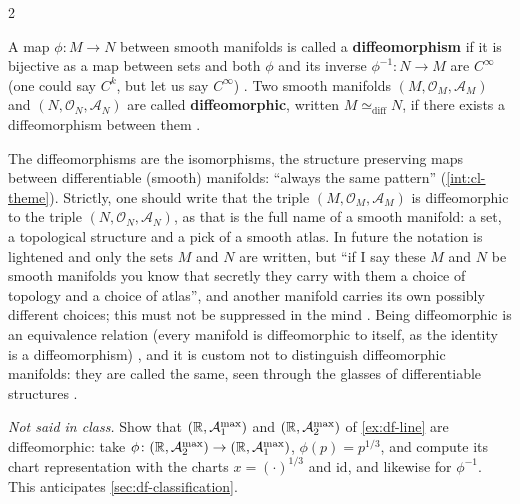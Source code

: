\begin{paracol}{2}
\begin{definition}\label{def:df-diffeo}
A map $\phi\colon M\to N$ between smooth manifolds is called a \textbf{diffeomorphism} if it is bijective as a map between sets and both $\phi$ and its inverse $\phi^{-1}\colon N\to M$ are $C^\infty$ (one could say $C^k$, but let us say $C^\infty$)
. Two smooth manifolds $(M,\mathcal O_M,\mathcal A_M)$ and $(N,\mathcal O_N,\mathcal A_N)$ are called \textbf{diffeomorphic}, written $M\simeq_{\mathrm{diff}}N$, if there exists a diffeomorphism between them
.
\end{definition}
The diffeomorphisms are the isomorphisms, the structure preserving maps between differentiable (smooth) manifolds: ``always the same pattern'' (\cref{int:cl-theme}). Strictly, one should write that the triple $(M,\mathcal O_M,\mathcal A_M)$ is diffeomorphic to the triple $(N,\mathcal O_N,\mathcal A_N)$, as that is the full name of a smooth manifold:
a set, a topological structure and a pick of a smooth atlas. In future the notation is lightened and only the sets $M$ and $N$ are written, but ``if I say these $M$ and $N$ be smooth manifolds you know that secretly they carry with them a choice of topology and a choice of atlas'', and another manifold carries its own possibly
different choices; this must not be suppressed in the mind . Being diffeomorphic is an equivalence relation (every manifold is diffeomorphic to itself, as the identity is a diffeomorphism) , and it is custom not to distinguish
diffeomorphic manifolds: they are called the same, seen through the glasses of differentiable structures .

\begin{exercise}\label{ex:df-line-diffeo}
\emph{Not said in class.} Show that $(\mathbb{R},\mathcal A_1^{\max})$ and $(\mathbb{R},\mathcal A_2^{\max})$ of \cref{ex:df-line} are diffeomorphic: take $\phi\colon(\mathbb{R},\mathcal A_2^{\max})\to(\mathbb{R},\mathcal A_1^{\max})$, $\phi(p)=p^{1/3}$, and compute its chart representation with the charts $x=(\cdot)^{1/3}$ and $\mathrm{id}$,
and likewise for $\phi^{-1}$. This anticipates \cref{sec:df-classification}.
\end{exercise}


\end{paracol}
